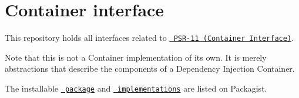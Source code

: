 \chapter{Container interface}
\hypertarget{md_vendor_2psr_2container_2_r_e_a_d_m_e}{}\label{md_vendor_2psr_2container_2_r_e_a_d_m_e}
This repository holds all interfaces related to \href{https://www.php-fig.org/psr/psr-11/}{\texttt{ PSR-\/11 (Container Interface)}}.

Note that this is not a Container implementation of its own. It is merely abstractions that describe the components of a Dependency Injection Container.

The installable \href{https://packagist.org/packages/psr/container}{\texttt{ package}} and \href{https://packagist.org/providers/psr/container-implementation}{\texttt{ implementations}} are listed on Packagist. 